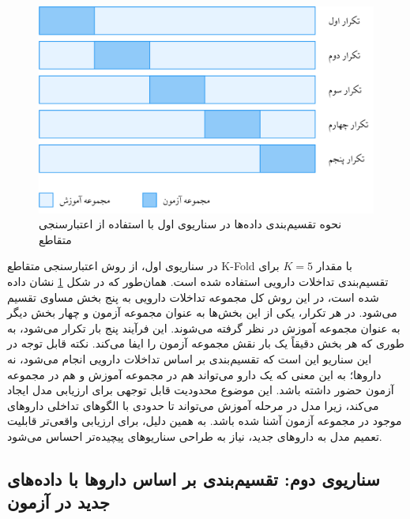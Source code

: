 \begin{figure}[t]
	\centering
	\includegraphics[width=\textwidth]{images/senario-1.png}
	\caption{نحوه تقسیم‌بندی داده‌ها در سناریوی اول با استفاده از اعتبارسنجی متقاطع }
	\label{fig:senario-1}
\end{figure}

در سناریوی اول، از روش اعتبارسنجی متقاطع K-Fold با مقدار $K=5$ برای تقسیم‌بندی تداخلات دارویی استفاده شده است. همان‌طور که در شکل \ref{fig:senario-1} نشان داده شده است، در این روش کل مجموعه تداخلات دارویی به پنج بخش مساوی تقسیم می‌شود. در هر تکرار، یکی از این بخش‌ها به عنوان مجموعه آزمون و چهار بخش دیگر به عنوان مجموعه آموزش در نظر گرفته می‌شوند. این فرآیند پنج بار تکرار می‌شود، به طوری که هر بخش دقیقاً یک بار نقش مجموعه آزمون را ایفا می‌کند. نکته قابل توجه در این سناریو این است که تقسیم‌بندی بر اساس تداخلات دارویی انجام می‌شود، نه داروها؛ به این معنی که یک دارو می‌تواند هم در مجموعه آموزش و هم در مجموعه آزمون حضور داشته باشد. این موضوع محدودیت قابل توجهی برای ارزیابی مدل ایجاد می‌کند، زیرا مدل در مرحله آموزش می‌تواند تا حدودی با الگوهای تداخلی داروهای موجود در مجموعه آزمون آشنا شده باشد. به همین دلیل، برای ارزیابی واقعی‌تر قابلیت تعمیم مدل به داروهای جدید، نیاز به طراحی سناریوهای پیچیده‌تر احساس می‌شود.

\subsection{سناریوی دوم: تقسیم‌بندی بر اساس داروها با داده‌های جدید در آزمون}

